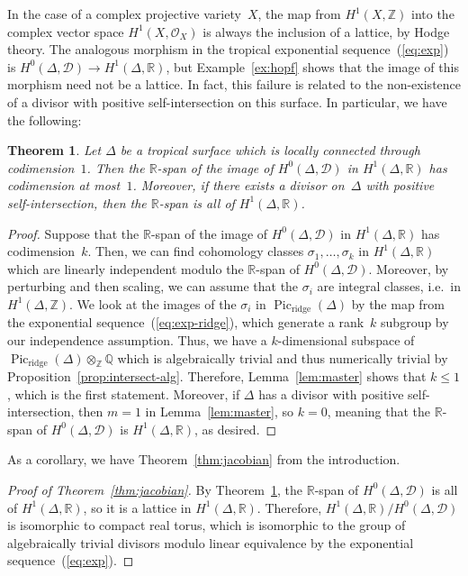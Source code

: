 \documentclass[11pt]{amsart}
\newtheorem{thm}{Theorem}[section]
\theoremstyle{definition}
\newcommand{\cD}{\mathcal D}
\newcommand{\Pic}{\operatorname{Pic}}
\newcommand{\QQ}{\mathbb Q}
\newcommand{\ridge}{\operatorname{ridge}}
\newcommand{\RR}{\mathbb R}
\newcommand{\ZZ}{\mathbb Z}
\begin{document}
In the case of a complex projective variety~$X$, the map from $H^1(X, \ZZ)$ into
the complex vector space $H^1(X, \mathcal O_X)$ is always the inclusion of a
lattice, by Hodge theory. The analogous morphism in the tropical exponential
sequence~(\ref{eq:exp}) is $H^0(\Delta, \cD) \rightarrow H^1(\Delta, \RR)$, but
Example~\ref{ex:hopf} shows that the image of this morphism need not be a
lattice. In fact, this failure is related to the non-existence of a divisor with
positive self-intersection on this surface. In particular, we have the
following:

\begin{thm}\label{thm:differentials}
Let $\Delta$ be a tropical surface which is locally connected through
codimension~$1$. Then the $\RR$-span of the image of $H^0(\Delta, \cD)$ in
$H^1(\Delta, \RR)$ has codimension at most~$1$. Moreover, if there exists a
divisor on~$\Delta$ with positive self-intersection, then the $\RR$-span is all
of $H^1(\Delta, \RR)$.
\end{thm}

\begin{proof}
Suppose that the $\RR$-span of the image of $H^0(\Delta, \cD)$ in $H^1(\Delta,
\RR)$ has codimension~$k$. Then, we can find cohomology classes $\sigma_1,
\ldots, \sigma_k$ in $H^1(\Delta, \RR)$ which are linearly independent modulo
the $\RR$-span of $H^0(\Delta, \cD)$. Moreover, by perturbing and then scaling,
we can assume that the $\sigma_i$ are integral classes, i.e.\ in $H^1(\Delta,
\ZZ)$. We look at the images of the $\sigma_i$ in $\Pic_{\ridge}(\Delta)$ by the
map from the exponential sequence~(\ref{eq:exp-ridge}), which generate a
rank~$k$ subgroup by our independence assumption. Thus, we have a
$k$-dimensional subspace of $\Pic_{\ridge}(\Delta) \otimes_{\ZZ} \QQ$ which is algebraically
trivial and thus numerically trivial by Proposition~\ref{prop:intersect-alg}.
Therefore, Lemma~\ref{lem:master} shows that $k \leq 1$, which is the first
statement. Moreover, if $\Delta$ has a divisor with positive self-intersection,
then $m = 1$ in Lemma~\ref{lem:master}, so $k = 0$, meaning that the $\RR$-span
of $H^0(\Delta, \cD)$ is $H^1(\Delta, \RR)$, as desired.
\end{proof}

As a corollary, we have Theorem~\ref{thm:jacobian} from the introduction.

\begin{proof}[Proof of Theorem~\ref{thm:jacobian}]
By Theorem~\ref{thm:differentials}, the $\RR$-span of $H^0(\Delta, \cD)$ is all
of $H^1(\Delta, \RR)$, so it is a lattice in $H^1(\Delta, \RR)$. Therefore,
$H^1(\Delta, \RR) / H^0(\Delta, \cD)$ is isomorphic to compact real torus, which
is isomorphic to the group of algebraically trivial divisors modulo linear
equivalence by the exponential sequence~(\ref{eq:exp}).
\end{proof}
\end{document}
